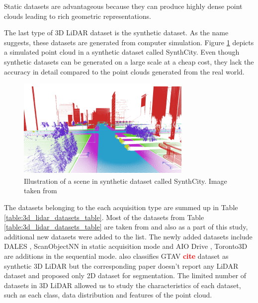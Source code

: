     Static datasets are advantageous because they can produce highly dense point clouds leading to rich geometric representations.
    
    The last type of 3D LiDAR dataset is the synthetic dataset. 
    As the name suggests, these datasets are generated from computer simulation. 
    Figure \ref{fig:synthetic} depicts a simulated point cloud in a synthetic dataset called SynthCity.
    Even though synthetic datasets can be generated on a large scale at a cheap cost, they lack the accuracy in detail compared to the point clouds generated from the real world.
    \begin{figure}[h!]
        \centering
        \includegraphics[scale=0.5]{images/synthcity.png}
        \caption{Illustration of a scene in synthetic dataset called SynthCity. Image taken from \cite{griffiths2019synthcity}}
        \label{fig:synthetic}
    \end{figure}
    
    The datasets belonging to the each acquisition type are summed up in  Table \ref{table:3d_lidar_datasets_table}.
    Most of the datasets from Table \ref{table:3d_lidar_datasets_table} are taken from \cite{survey3d} and also as a part of this study, additional new datasets were added to the list.
    The newly added datasets include DALES \cite{varney2020dales}, ScanObjectNN \cite{scanobejctnn} in static acquisition mode and AIO Drive \cite{Weng2020_AIODrive}, Toronto3D \cite{tan2020toronto3d} are additions in the sequential mode.
    \cite{survey3d} also classifies GTAV \textcolor{red}{\textbf{cite}} dataset as synthetic 3D LiDAR but the corresponding paper doesn't report any LiDAR dataset and proposed only 2D dataset for segmentation.
    The limited number of datasets in 3D LiDAR allowed us to study the characteristics of each dataset, such as each class, data distribution and features of the point cloud. 
    
